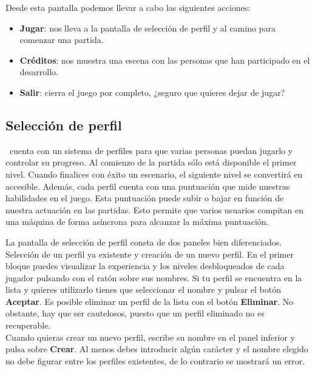 \documentclass[a4paper,11pt]{article}
\begin{document}

Desde esta pantalla podemos llevar a cabo las siguientes acciones:

\begin{itemize}
    \itemsep0em
    \item \textbf{Jugar}: nos lleva a la pantalla de selección de perfil
    y al camino para comenzar una partida.
    \item \textbf{Créditos}: nos muestra una escena con las personas
    que han participado en el desarrollo.
    \item \textbf{Salir}: cierra el juego por completo, ¿seguro que quieres
    dejar de jugar?
\end{itemize}

\subsection{Selección de perfil}

\juego\ cuenta con un sistema de perfiles para que varias personas puedan
jugarlo y controlar su progreso. Al comienzo de la partida sólo está disponible
el primer nivel. Cuando finalices con éxito un escenario, el
siguiente nivel se convertirá en accesible. Además, cada perfil cuenta con
una puntuación que mide nuestras habilidades en el juego. Esta puntuación
puede subir o bajar en función de nuestra actuación en las partidas. Esto
permite que varios usuarios compitan en una máquina de forma asíncrona
para alcanzar la máxima puntuación.\\


La pantalla de selección de perfil consta de dos paneles bien diferenciados.
Selección de un perfil ya existente y creación de un nuevo perfil. En el primer
bloque puedes visualizar la experiencia y los niveles desbloqueados de
cada jugador pulsando con el ratón sobre sus nombres. Si tu
perfil se encuentra en la lista y quieres utilizarlo tienes que seleccionar
el nombre y pulsar el botón \textbf{Aceptar}. Es posible eliminar
un perfil de la lista con el botón \textbf{Eliminar}. No obstante, 
hay que ser cautelosos, puesto que un perfil eliminado no es recuperable.\\

Cuando quieras crear un nuevo perfil, escribe su nombre en el panel
inferior y pulsa sobre \textbf{Crear}. Al menos debes introducir algún
carácter y el nombre elegido no debe figurar entre los perfiles existentes,
de lo contrario se mostrará un error.\\
\end{document}
